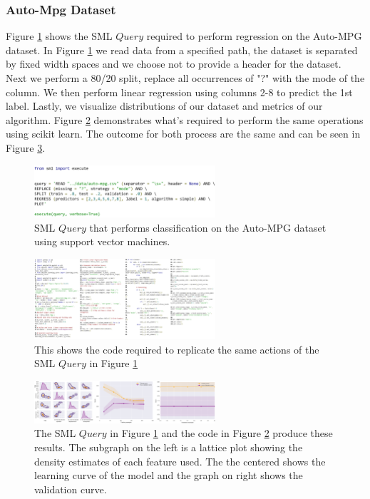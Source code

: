 \documentclass[jair,twoside,11pt,theapa]{article}
\begin{document}
\subsubsection{Auto-Mpg Dataset}
Figure \ref{fig:SML:AutoMPGQuery} shows the SML \(Query\) required to perform regression on the Auto-MPG dataset. In Figure \ref{fig:SML:AutoMPGQuery} we read data from a specified path, the dataset is separated by fixed width spaces and we choose not to provide a header for the dataset.  Next we perform a 80/20 split, replace all occurrences of "?" with the mode of the column. We then perform linear regression using columns 2-8 to predict the 1st label. Lastly, we visualize distributions of our dataset and metrics of our algorithm. Figure \ref{fig:Manual:Auto-MPG} demonstrates what's required to perform the same operations using scikit learn. The outcome for both process are the same and can be seen in Figure \ref{fig:AutoMPG:Results}.

\begin{figure}
\includegraphics[width=0.6\textwidth]{figs/autompg_sml.png}
\centering
\caption{SML \(Query\) that performs classification on the Auto-MPG dataset using support vector machines.}
\label{fig:SML:AutoMPGQuery}
\end{figure}

\begin{figure}
\includegraphics[width=0.6\textwidth]{figs/auto-mpg_manual.png}
\centering
\caption{This shows the code required to replicate the same actions of the SML \(Query\) in Figure \ref{fig:SML:AutoMPGQuery}}
\label{fig:Manual:Auto-MPG}
\end{figure}

\begin{figure}
\includegraphics[width=0.6\textwidth]{figs/auto-mpg-results.png}
\centering
\caption{The SML \(Query\) in Figure \ref{fig:SML:AutoMPGQuery}  and the code in Figure \ref{fig:Manual:Auto-MPG} produce these results. The subgraph on the left is a lattice plot showing the density estimates of each feature used. The the centered shows the learning curve of the model and the graph on right shows the validation curve.}
\label{fig:AutoMPG:Results}
\end{figure}
\end{document}
